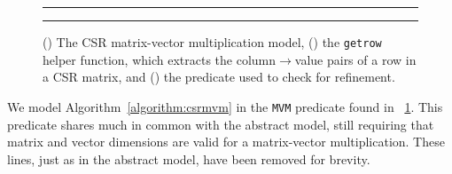 \documentclass[sigconf]{acmart}
\begin{document}
\begin{figure}
\begin{subfigure}[b]{0.5\textwidth}
  \centering
  
  \caption{}
  \label{alloy:mvmcsr}
\end{subfigure}
{\color{lightgray}\rule{0.4\textwidth}{0.1pt}}
\par\bigskip
\begin{subfigure}[b]{0.5\textwidth}
  \centering
  
  \caption{}
  \label{alloy:getrow}
\end{subfigure}
{\color{lightgray}\rule{0.4\textwidth}{0.1pt}}
\par\bigskip
\begin{subfigure}[b]{0.5\textwidth}
  \centering
  
  \caption{}
  \label{alloy:mvmcsrref}
\end{subfigure}
\caption{() The CSR matrix-vector multiplication model, () the \texttt{getrow} helper function, which extracts the column$\rightarrow$value pairs of a row in a CSR matrix, and () the predicate used to check for refinement.}
\end{figure}

We model Algorithm~\ref{algorithm:csrmvm} in the \texttt{MVM} predicate found in \figurename~\ref{alloy:mvmcsr}.  This predicate shares much in common with the abstract model, still requiring that matrix and vector dimensions are valid for a matrix-vector multiplication.  These lines, just as in the abstract model, have been removed for brevity.



\end{document}
